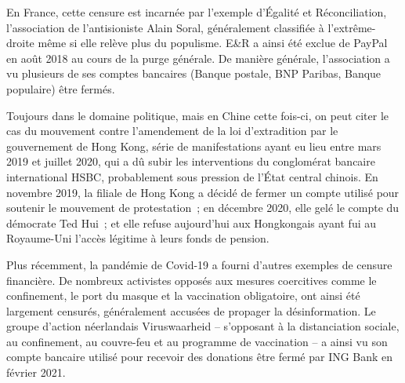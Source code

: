
En France, cette censure est incarnée par l'exemple d'Égalité et Réconciliation, l'association de l'antisioniste Alain Soral, généralement classifiée à l'extrême-droite même si elle relève plus du populisme. E\&R a ainsi été exclue de PayPal en août 2018 au cours de la purge générale. De manière générale, l'association a vu plusieurs de ses comptes bancaires (Banque postale, BNP Paribas, Banque populaire) être fermés.

Toujours dans le domaine politique, mais en Chine cette fois-ci, on peut citer le cas du mouvement contre l'amendement de la loi d'extradition par le gouvernement de Hong Kong, série de manifestations ayant eu lieu entre mars 2019 et juillet 2020, qui a dû subir les interventions du conglomérat bancaire international HSBC, probablement sous pression de l'État central chinois. En novembre 2019, la filiale de Hong Kong a décidé de fermer un compte utilisé pour soutenir le mouvement de protestation~; en décembre 2020, elle gelé le compte du démocrate Ted Hui~; et elle refuse aujourd'hui aux Hongkongais ayant fui au Royaume-Uni l'accès légitime à leurs fonds de pension.

Plus récemment, la pandémie de Covid-19 a fourni d'autres exemples de censure financière. De nombreux activistes opposés aux mesures coercitives comme le confinement, le port du masque et la vaccination obligatoire, ont ainsi été largement censurés, généralement accusées de propager la désinformation. Le groupe d'action néerlandais Viruswaarheid -- s'opposant à la distanciation sociale, au confinement, au couvre-feu et au programme de vaccination -- a ainsi vu son compte bancaire utilisé pour recevoir des donations être fermé par ING Bank en février 2021.

